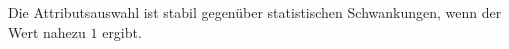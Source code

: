 Die Attributsauswahl ist stabil gegenüber statistischen Schwankungen, wenn der Wert nahezu $1$ ergibt.
\label{jaccard}
